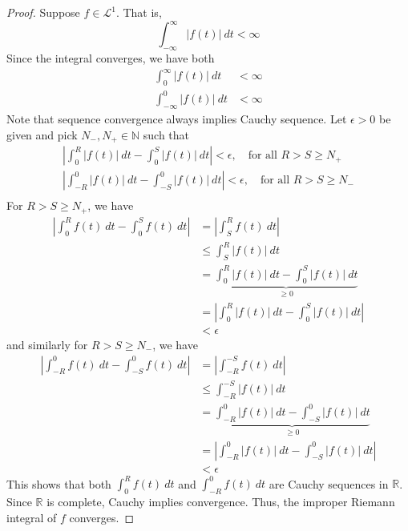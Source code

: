 \documentclass[12pt, reqno]{amsart}
\theoremstyle{definition}
\theoremstyle{remark}
\begin{document}
\begin{itemize}
\begin{itemize}
\begin{proof}
    Suppose $f\in\mathcal{L}^{1}$. That is, $$\int_{-\infty}^{\infty}|f(t)|\ dt<\infty$$Since the integral converges, we have both 
    \begin{align*}
        \int_{0}^{\infty}|f(t)|\ dt&< \infty\\
        \int_{-\infty}^{0}|f(t)|\ dt&< \infty
        \end{align*}
        Note that sequence convergence always implies Cauchy sequence. Let $\epsilon>0$ be given and pick $N_{-},N_{+}\in \mathbb{N}$ such that
        \begin{align*}
        \left|\int_{0}^{R}|f(t)|\ dt-\int_{0}^{S}|f(t)|\ dt\right|<\epsilon,\quad \text{for all }R>S\ge N_{+}\\
        \left|\int_{-R}^{0}|f(t)|\ dt-\int_{-S}^{0}|f(t)|\ dt\right|<\epsilon,\quad \text{for all }R>S\ge N_{-}\\
        \end{align*}
        For $R>S\ge N_{+}$, we have
        \begin{align*}
        \left|\int_{0}^{R}f(t)\ dt-\int_{0}^{S}f(t)\ dt\right|&= \left|\int_{S}^{R}f(t)\ dt\right|\\
        &\le \int_{S}^{R}|f(t)|\ dt\\
        &= \underbrace{\int_{0}^{R}|f(t)|\ dt-\int_{0}^{S}|f(t)|\ dt}_{\ge0}\\
        &= \left|\int_{0}^{R}|f(t)|\ dt-\int_{0}^{S}|f(t)|\ dt\right|\\
        &< \epsilon
        \end{align*}
        and similarly for $R>S\ge N_{-}$, we have 
        \begin{align*}
        \left|\int_{-R}^{0}f(t)\ dt-\int_{-S}^{0}f(t)\ dt\right|&= \left|\int_{-R}^{-S}f(t)\ dt\right|\\
        &\le \int_{-R}^{-S}|f(t)|\ dt\\
        &= \underbrace{\int_{-R}^{0}|f(t)|\ dt-\int_{-S}^{0}|f(t)|\ dt}_{\ge0}\\
        &= \left|\int_{-R}^{0}|f(t)|\ dt-\int_{-S}^{0}|f(t)|\ dt\right|\\
        &< \epsilon
        \end{align*}
        This shows that both $\int_{0}^{R}f(t)\ dt$ and $\int_{-R}^{0}f(t)\ dt$ are Cauchy sequences in $\mathbb{R}$. Since $\mathbb{R}$ is complete, Cauchy implies convergence. Thus, the improper Riemann integral of $f$ converges. 
\end{proof}


\end{itemize}
\end{itemize}
\end{document}
